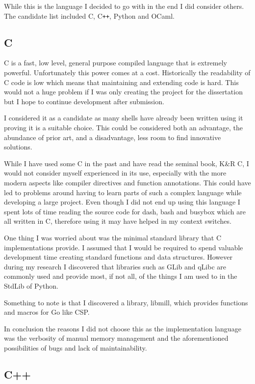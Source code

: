 While this is the language I decided to go with in the end I did consider others.
The candidate list included C, C\verb!++!, Python and OCaml.

\subsection{C}
C is a fast, low level, general purpose compiled language that is extremely powerful.
Unfortunately this power comes at a cost.
Historically the readability of C code is low which means that maintaining and extending code is hard.
This would not a huge problem if I was only creating the project for the dissertation but I hope to continue development after submission.

I considered it as a candidate as many shells have already been written using it proving it is a suitable choice.
This could be considered both an advantage, the abundance of prior art, and a disadvantage, less room to find innovative solutions.

While I have used some C in the past and have read the seminal book, K\&R C, I would not consider myself experienced in its use, especially with the more modern aspects like compiler directives and function annotations.
This could have led to problems around having to learn parts of such a complex language while developing a large project.
Even though I did not end up using this language I spent lots of time reading the source code for dash, bash and busybox which are all written in C, therefore using it  may have helped in my context switches. 

One thing I was worried about was the minimal standard library that C implementations provide.
I assumed that I would be required to spend valuable development time creating standard functions and data structures.
However during my research I discovered that libraries such as GLib and qLibc are commonly used and provide most, if not all, of the things I am used to in the StdLib of Python.

Something to note is that I discovered a library, libmill\cite{LIBMILL}, which provides functions and macros for Go like CSP.

In conclusion the reasons I did not choose this as the implementation language was the verbosity of manual memory management and the aforementioned possibilities of bugs and lack of maintainability. 


\subsection{C++}


